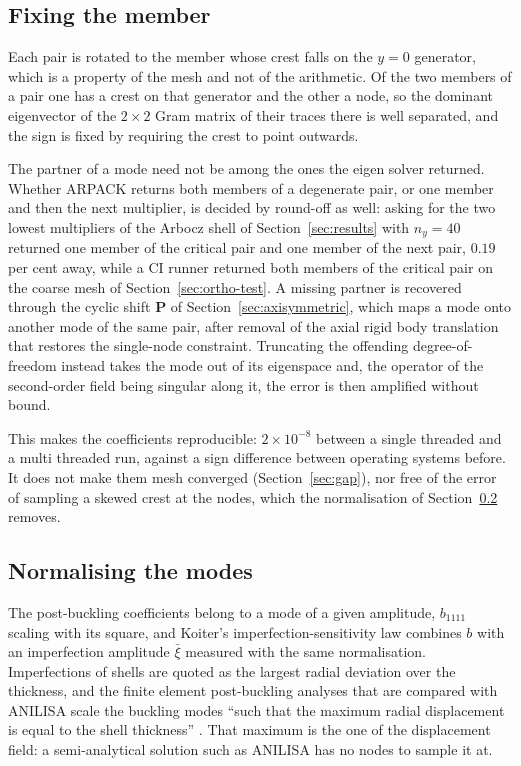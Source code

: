 \documentclass[11pt,a4paper]{article}
\begin{document}
\subsection{Fixing the member}

Each pair is rotated to the member whose crest falls on the $y = 0$
generator, which is a property of the mesh and not of the arithmetic.  Of the
two members of a pair one has a crest on that generator and the other a node,
so the dominant eigenvector of the $2\times2$ Gram matrix of their traces
there is well separated, and the sign is fixed by requiring the crest to point
outwards.

The partner of a mode need not be among the ones the eigen solver returned.
Whether ARPACK returns both members of a degenerate pair, or one member and
then the next multiplier, is decided by round-off as well: asking for the two
lowest multipliers of the Arbocz shell of Section~\ref{sec:results} with
$n_y = 40$ returned one member of the critical pair and one member of the next
pair, $0.19$ per cent away, while a CI runner returned both members of the
critical pair on the coarse mesh of Section~\ref{sec:ortho-test}.  A missing
partner is
recovered through the cyclic shift $\boldsymbol{P}$ of
Section~\ref{sec:axisymmetric}, which maps a mode onto another mode of the
same pair, after removal of the axial rigid body translation that restores the
single-node constraint.  Truncating the offending degree-of-freedom instead
takes the mode out of its eigenspace and, the operator of the second-order
field being singular along it, the error is then amplified without bound.

This makes the coefficients reproducible: $2\times10^{-8}$ between a single
threaded and a multi threaded run, against a sign difference between operating
systems before.  It does not make them mesh converged
(Section~\ref{sec:gap}), nor free of the error of sampling a skewed crest at
the nodes, which the normalisation of Section~\ref{sec:normalisation} removes.

\subsection{Normalising the modes}
\label{sec:normalisation}

The post-buckling coefficients belong to a mode of a given amplitude,
$b_{1111}$ scaling with its square, and Koiter's imperfection-sensitivity law
combines $b$ with an imperfection amplitude $\bar{\xi}$ measured with the same
normalisation.  Imperfections of shells are quoted as the largest radial
deviation over the thickness, and the finite element post-buckling analyses
that are compared with ANILISA scale the buckling modes ``such that the
maximum radial displacement is equal to the shell thickness''
\citep{rahman2007}.  That maximum is the one of the displacement field: a
semi-analytical solution such as ANILISA has no nodes to sample it at.
\end{document}
